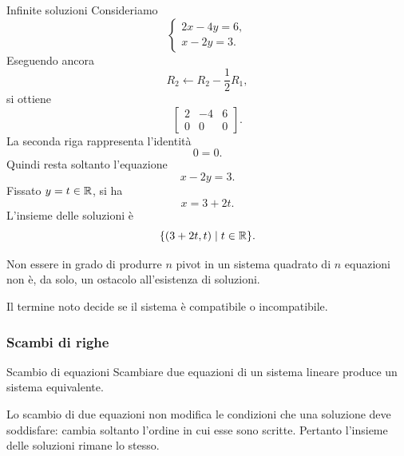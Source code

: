 \documentclass[a4paper]{article}
\begin{document}
\begin{snippetexample}{Infinite soluzioni}
    Consideriamo
    \[
        \begin{cases}
            2x-4y=6,\\
            x-2y=3.
        \end{cases}
    \]
    Eseguendo ancora
    \[
        R_2\leftarrow R_2-\frac{1}{2}R_1,
    \]
    si ottiene
    \[
        \left[
            \begin{array}{cc|c}
                2 & -4 & 6\\
                0 & 0 & 0
            \end{array}
        \right].
    \]
    La seconda riga rappresenta l'identità
    \[
        0=0.
    \]
    Quindi resta soltanto l'equazione
    \[
        x-2y=3.
    \]
    Fissato \(y=t\in\mathbb{R}\), si ha
    \[
        x=3+2t.
    \]
    L'insieme delle soluzioni è
    \[
        \{(3+2t,t)\mid t\in\mathbb{R}\}.
    \]
\end{snippetexample}

\begin{snippetremark}{}
    Non essere in grado di produrre \(n\) pivot in un sistema quadrato di \(n\) equazioni non è, da solo, un ostacolo all'esistenza di soluzioni.

    Il termine noto decide se il sistema è compatibile o incompatibile.
\end{snippetremark}

\subsubsection{Scambi di righe}

\begin{snippetlemma}{Scambio di equazioni}
    Scambiare due equazioni di un sistema lineare produce un sistema equivalente.
\end{snippetlemma}

\begin{snippetproof}{}
    Lo scambio di due equazioni non modifica le condizioni che una soluzione deve soddisfare: cambia soltanto l'ordine in cui esse sono scritte. Pertanto l'insieme delle soluzioni rimane lo stesso.
\end{snippetproof}
\end{document}
